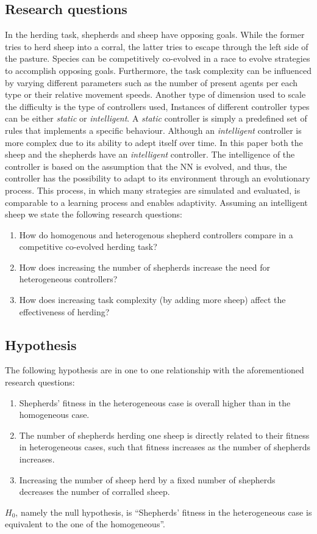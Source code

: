 \documentclass[conference]{IEEEtran}
\begin{document}
\subsection{Research questions}
\label{sec:researchQuestions}
In the herding task, shepherds and sheep have opposing goals.
While the former tries to herd sheep into a corral, the latter tries to escape through the left side of the pasture. 
Species can be competitively co-evolved in a race to evolve strategies to accomplish opposing goals. 
Furthermore, the task complexity can be influenced by varying different parameters such as the number of present agents per each type or their relative movement speeds. 
Another type of dimension used to scale the difficulty is the type of controllers used,
Instances of different controller types can be either \textit{static} or \textit{intelligent}.
A \textit{static} controller is simply a predefined set of rules that implements a specific behaviour.
Although an \textit{intelligent} controller is more complex due to its ability to adept itself over time.
In this paper both the sheep and the shepherds have an \textit{intelligent} controller.
The intelligence of the controller is based on the assumption that the NN is evolved, and thus, the controller has the possibility to adapt to its environment through an evolutionary process. 
This process, in which many strategies are simulated and evaluated, is comparable to a learning process and enables adaptivity. 
Assuming an intelligent sheep we state the following research questions:

\begin{enumerate}
	\item How do homogenous and heterogenous shepherd controllers compare in a competitive co-evolved herding task?
	\item How does increasing the number of shepherds increase the need for heterogeneous controllers?
	\item How does increasing task complexity (by adding more sheep) affect the effectiveness of herding?
\end{enumerate}

\subsection{Hypothesis}
\label{sec:hypothesis}
The following hypothesis are in one to one relationship with the aforementioned research questions:

\begin{enumerate}
	\item Shepherds' fitness in the heterogeneous case is overall higher than in the homogeneous case.
	\item The number of shepherds herding one sheep is directly related to their fitness in heterogeneous cases, such that fitness increases as the number of shepherds increases.	
	\item Increasing the number of sheep herd by a fixed number of shepherds decreases the number of corralled sheep.
\end{enumerate}
$H_0$, namely the null hypothesis, is ``Shepherds’ fitness in the heterogeneous case is equivalent to the one of the homogeneous''.
\end{document}
